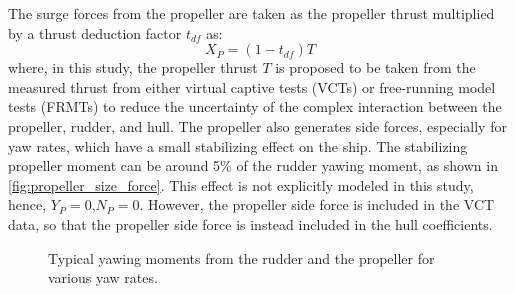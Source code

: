 \noindent The surge forces from the propeller are taken as the propeller thrust multiplied by a thrust deduction factor $t_{df}$ as:
\begin{equation}
    \label{eq:X_P}
    X_P = (1-t_{df})T
\end{equation}
where, in this study, the propeller thrust $T$ is proposed to be taken from the measured thrust from either virtual captive tests (VCTs) or free-running model tests (FRMTs) to reduce the uncertainty of the complex interaction between the propeller, rudder, and hull. The propeller also generates side forces, especially for yaw rates, which have a small stabilizing effect on the ship. The stabilizing propeller moment can be around 5\% of the rudder yawing moment, as shown in \autoref{fig:propeller_size_force}.
This effect is not explicitly modeled in this study, hence, $Y_P=0$,$N_P=0$. However, the propeller side force is included in the VCT data, so that the propeller side force is instead included in the hull coefficients.

\begin{figure}[h!]
    \centering   
    
    \caption{Typical yawing moments from the rudder and the propeller for various yaw rates.}
    \label{fig:propeller_size_force}
\end{figure}